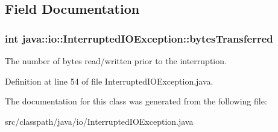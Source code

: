 \subsection{Field Documentation}
\subsubsection[{bytesTransferred}]{\setlength{\rightskip}{0pt plus 5cm}int {\bf java::io::InterruptedIOException::bytesTransferred}}\label{classjava_1_1io_1_1_interrupted_i_o_exception_a774dad93f8d2a176dfe04e289238cd12}
The number of bytes read/written prior to the interruption. 

Definition at line 54 of file InterruptedIOException.java.



The documentation for this class was generated from the following file:\begin{DoxyCompactItemize}
\item 
src/classpath/java/io/InterruptedIOException.java\end{DoxyCompactItemize}
